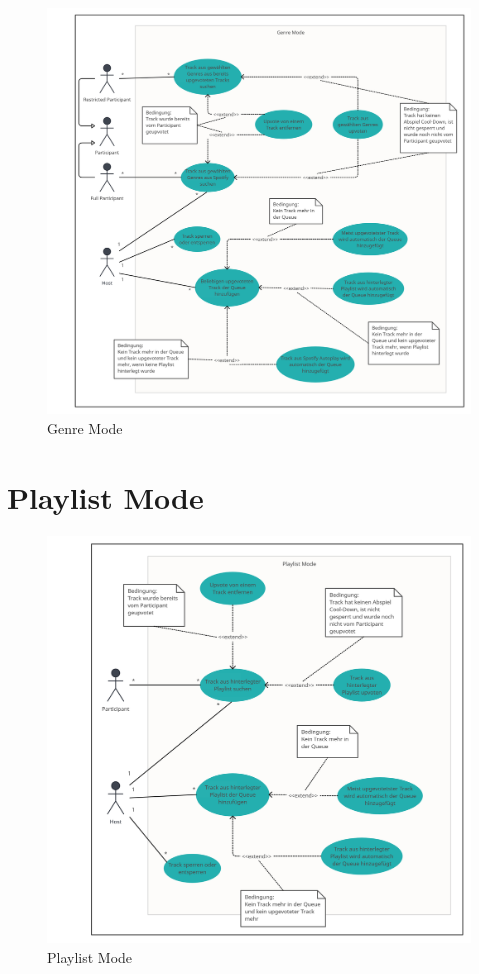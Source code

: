 \documentclass[oneside, ngerman]{sdqtechreport}
\begin{document}
\begin{figure}[h]
    \includegraphics[width = 16cm]{LATEX/Pflichtenheft/GraphicDesigns/Use Case Genre Mode.png}
    \caption{Genre Mode}
    \label{fig:Use Case Genre Mode}
\end{figure}

\newpage

\section{Playlist Mode}
\label{sec:Anwendungsfälle:Playlist Mode}
\hypertarget{Playlist Mode}{}

\begin{figure}[h]
    \includegraphics[width = 16cm]{LATEX/Pflichtenheft/GraphicDesigns/Use Case Playlist Mode.png}
    \caption{Playlist Mode}
    \label{fig:Use Case Playlist Mode}
\end{figure}
\end{document}
